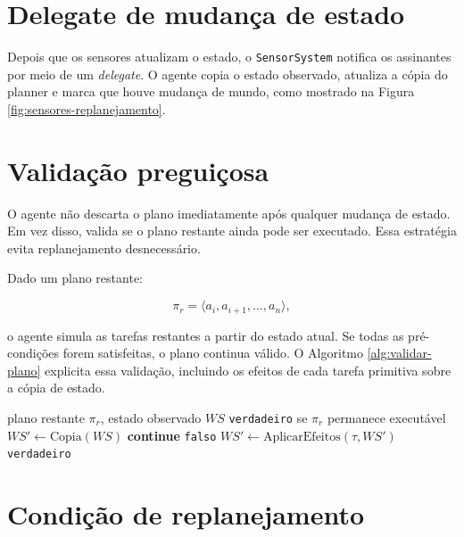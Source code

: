 \section{Delegate de mudança de estado}

Depois que os sensores atualizam o estado, o \texttt{SensorSystem} notifica os
assinantes por meio de um \textit{delegate}. O agente copia o estado observado,
atualiza a cópia do planner e marca que houve mudança de mundo, como mostrado
na Figura \ref{fig:sensores-replanejamento}.



\section{Validação preguiçosa}

O agente não descarta o plano imediatamente após qualquer mudança de estado.
Em vez disso, valida se o plano restante ainda pode ser executado.
Essa estratégia evita replanejamento desnecessário.

Dado um plano restante:

\begin{equation}
\pi_r =
\langle a_i,a_{i+1},\dots,a_n \rangle,
\end{equation}

o agente simula as tarefas restantes a partir do estado atual. Se todas as
pré-condições forem satisfeitas, o plano continua válido. O Algoritmo
\ref{alg:validar-plano} explicita essa validação, incluindo os efeitos de cada
tarefa primitiva sobre a cópia de estado.

\begin{algorithm}[H]
\caption{Método \texttt{\_is\_plan\_still\_valid}}
\label{alg:validar-plano}
\begin{algorithmic}[1]
\Require plano restante $\pi_r$, estado observado $WS$
\Ensure \texttt{verdadeiro} se $\pi_r$ permanece executável
\State $WS' \gets \mathrm{Copia}(WS)$
    \State \textbf{continue}
  \EndIf
    \State \Return \texttt{falso}
  \EndIf
  \State $WS' \gets \mathrm{AplicarEfeitos}(\tau,WS')$
\EndFor
\State \Return \texttt{verdadeiro}
\end{algorithmic}
\end{algorithm}

\section{Condição de replanejamento}

